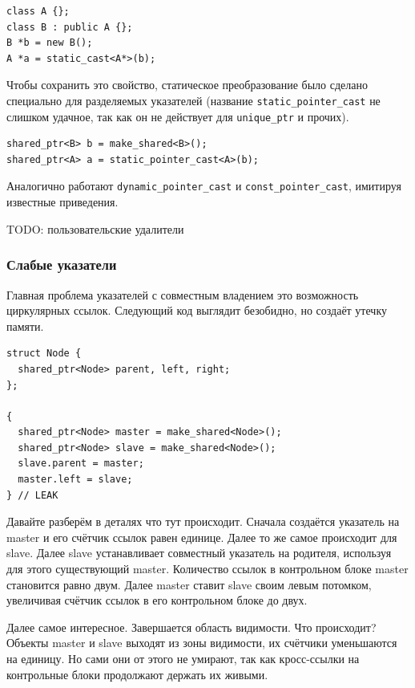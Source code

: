 \documentclass[a4paper,12pt,oneside]{article}
\begin{document}
\begin{lstlisting}
class A {};
class B : public A {};
B *b = new B();
A *a = static_cast<A*>(b);
\end{lstlisting}

Чтобы сохранить это свойство, статическое преобразование было сделано специально для разделяемых указателей (название \lstinline!static_pointer_cast! не слишком удачное, так как он не действует для \lstinline!unique_ptr! и прочих).

\begin{lstlisting}
shared_ptr<B> b = make_shared<B>();
shared_ptr<A> a = static_pointer_cast<A>(b);
\end{lstlisting}

Аналогично работают \lstinline!dynamic_pointer_cast! и \lstinline!const_pointer_cast!, имитируя известные приведения.

TODO: пользовательские удалители

\subsubsection{Слабые указатели}\label{subsub:weakptrs}

Главная проблема указателей с совместным владением это возможность циркулярных ссылок. Следующий код выглядит безобидно, но создаёт утечку памяти.

\begin{lstlisting}
struct Node {
  shared_ptr<Node> parent, left, right;
};

{
  shared_ptr<Node> master = make_shared<Node>();
  shared_ptr<Node> slave = make_shared<Node>();
  slave.parent = master;
  master.left = slave;
} // LEAK
\end{lstlisting}

Давайте разберём в деталях что тут происходит. Сначала создаётся указатель на master и его счётчик ссылок равен единице. Далее то же самое происходит для slave. Далее slave устанавливает совместный указатель на родителя, используя для этого существующий master. Количество ссылок в контрольном блоке master становится равно двум. Далее master ставит slave своим левым потомком, увеличивая счётчик ссылок в его контрольном блоке до двух.

Далее самое интересное. Завершается область видимости. Что происходит? Объекты master и slave выходят из зоны видимости, их счётчики уменьшаются на единицу. Но сами они от этого не умирают, так как кросс-ссылки на контрольные блоки продолжают держать их живыми.
\end{document}
